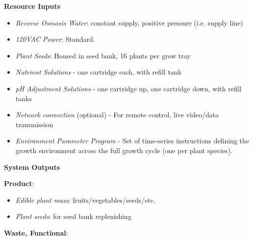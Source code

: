 \documentclass{report}
\begin{document}
\textbf{Resource Inputs}
\label{sec:resource-inputs}




\begin{itemize}
    \item \textit{Reverse Osmosis Water}: constant supply, positive pressure (i.e. supply line)
    \item \textit{120VAC Power}: Standard.
    \item \textit{Plant Seeds}: Housed in seed bank, 16 plants per grow tray
    \item \textit{Nutrient Solutions} - one cartridge each, with refill tank
    \item \textit{pH Adjustment Solutions} - one cartridge up, one cartridge down, with refill tanks
    \item \textit{Network connection} (optional) - For remote control, live video/data transmission
    \item \textit{Environment Parameter Program} - Set of time-series instructions defining the growth environment across the full growth cycle (one per plant species).
\end{itemize}


\textbf{System Outputs}
\label{sec:resource-outputs}




\textbf{Product}:

\begin{itemize}
    \item \textit{Edible plant mass}: fruits/vegetables/seeds/etc.
    \item \textit{Plant seeds}: for seed bank replenishing
\end{itemize}

\textbf{Waste, Functional}:
\end{document}
